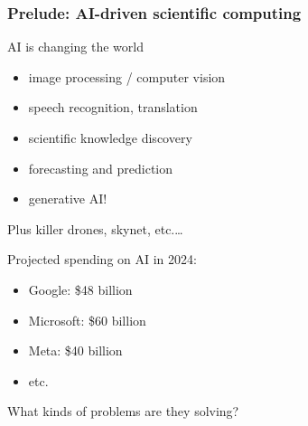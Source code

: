 \documentclass[
    xcolor={svgnames,dvipsnames},
    hyperref={colorlinks, citecolor=DeepPink4, linkcolor=DarkRed, urlcolor=DarkBlue}
    ]{beamer}  %
\newcommand{\1}{\mathbbm 1}
\begin{document}
\begin{frame}
    \frametitle{Prelude: AI-driven scientific computing}

    AI is changing the world

    \begin{itemize}
        \item image processing / computer vision
        \vspace{0.5em}
        \item speech recognition, translation
        \vspace{0.5em}
        \item scientific knowledge discovery
        \vspace{0.5em}
        \item forecasting and prediction 
        \vspace{0.5em}
        \item generative AI!
    \end{itemize}

    \pause

        \vspace{0.5em}
        \vspace{0.5em}
        \vspace{0.5em}
    Plus killer drones, skynet, etc.\ldots

    
\end{frame}

\begin{frame}
    
    Projected spending on AI in 2024:

    \begin{itemize}
        \item Google: \$48 billion
        \vspace{0.5em}
        \item Microsoft: \$60 billion
        \vspace{0.5em}
        \item Meta: \$40 billion
        \vspace{0.5em}
        \item etc.
    \end{itemize}

        \vspace{0.5em}
        \vspace{0.5em}
        \vspace{0.5em}
        \vspace{0.5em}

    What kinds of problems are they solving?

\end{frame}
\end{document}
